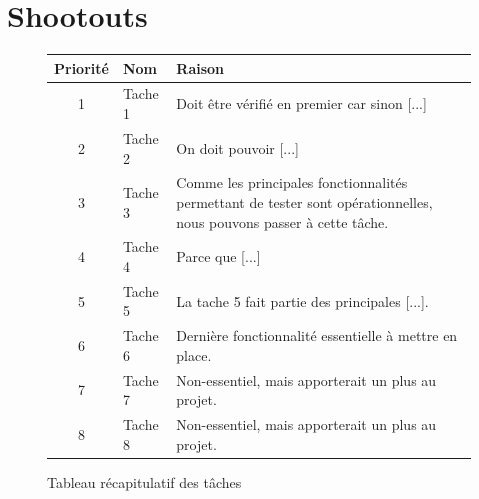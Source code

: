 \newpage
\section{Shootouts}

\begin{figure}[!h]
\begin{center}
\begin{tabularx}{17cm}{|c|p{6cm}|X|}
  \hline
  Priorité & Nom & Raison\\
  \hline
  1 & Tache 1 & Doit être vérifié en premier car sinon [...] \tabularnewline
  2 & Tache 2 & On doit pouvoir [...] \tabularnewline
  3 & Tache 3 & Comme les principales fonctionnalités permettant de tester sont opérationnelles, nous pouvons passer à cette tâche. \tabularnewline
  4 & Tache 4 & Parce que [...] \tabularnewline
  5 & Tache 5 & La tache 5 fait partie des principales [...]. \tabularnewline
  6 & Tache 6 & Dernière fonctionnalité essentielle à mettre en place. \tabularnewline
  7 & Tache 7 & Non-essentiel, mais apporterait un plus au projet. \tabularnewline
  8 & Tache 8 & Non-essentiel, mais apporterait un plus au projet. \tabularnewline
  \hline
\end{tabularx}
\end{center}
\caption{Tableau récapitulatif des tâches}
\end{figure}